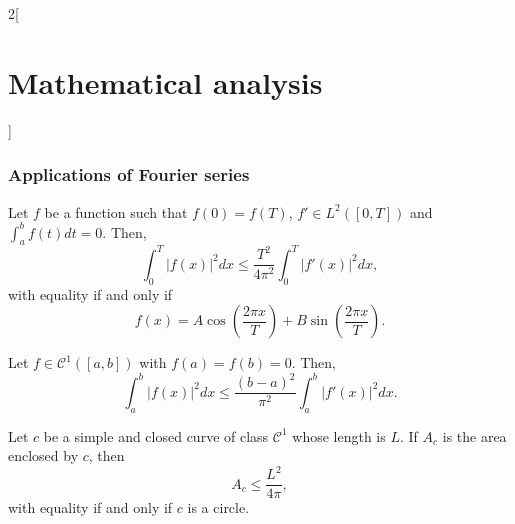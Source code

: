\documentclass[../../../main.tex]{subfiles}
\begin{document}
\begin{multicols}{2}[\section{Mathematical analysis}]
\subsubsection*{Applications of Fourier series}
\begin{theorem}
Let $f$ be a function such that $f(0)=f(T)$, $f'\in L^2([0,T])$ and $\displaystyle\int_a^bf(t)dt=0$. Then, $$\int_0^T|f(x)|^2dx\leq\frac{T^2}{4\pi^2}\int_0^T|f'(x)|^2dx,$$ with equality if and only if $$f(x)=A\cos\left(\frac{2\pi x}{T}\right)+B\sin\left(\frac{2\pi x}{T}\right).$$
\end{theorem}
\begin{theorem}
Let $f\in \mathcal{C}^1([a,b])$ with $f(a)=f(b)=0$. Then, $$\int_a^b|f(x)|^2dx\leq\frac{(b-a)^2}{\pi^2}\int_a^b|f'(x)|^2dx.$$
\end{theorem}
\begin{theorem}
Let $c$ be a simple and closed curve of class $\mathcal{C}^1$ whose length is $L$. If $A_c$ is the area enclosed by $c$, then $$A_c\leq\frac{L^2}{4\pi},$$ with equality if and only if $c$ is a circle.
\end{theorem}
\end{multicols}
\end{document}
